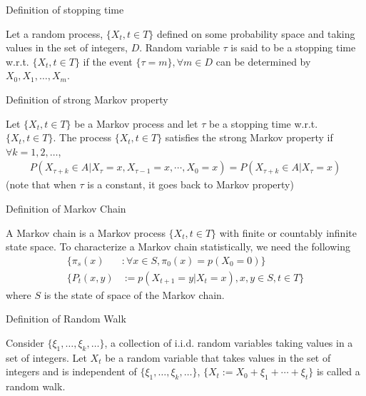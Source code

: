 \documentclass[11pt]{article}
\newcommand*{\xfield}[1]{\begin{mdframed}\centering #1\end{mdframed}\bigskip}
\newenvironment{field}{}{}
\newenvironment{note}{}{}
\begin{document}
%
\begin{note}
  \xfield{Definition of stopping time}
  \begin{field}
    Let a random process, \(\{X_t, t \in T\}\) defined on
    some probability space and taking values in the set of
    integers, \(D\). Random variable \(\tau\) is said to be a stopping time
    w.r.t. \(\{X_t, t \in T\}\) if the event \(\{\tau = m\}, \forall m
    \in D\) can be determined by \(X_0, X_1, \ldots, X_m\).
  \end{field}
\end{note}
%
\begin{note}
  \xfield{Definition of strong Markov property}
  \begin{field}
    Let \(\{X_t, t \in T\}\) be a Markov process and let \(\tau\) be a
    stopping time w.r.t. \(\{X_t, t \in T\}\). The process \(\{X_t, t
    \in T\}\) satisfies the strong Markov property if \(\forall k =
    1,2,\ldots\),
    \begin{align*}
      P(X_{\tau+k} \in A | X_\tau = x, X_{\tau - 1} = x, \cdots, X_0 =
      x) = P(X_{\tau + k} \in A | X_\tau = x)
    \end{align*}
    (note that when \(\tau\) is a constant, it goes back to Markov property)
  \end{field}
\end{note}
%
\begin{note}
  \xfield{Definition of Markov Chain}
  \begin{field}
    A Markov chain is a Markov process \(\{X_t, t \in T\}\) with
    finite or countably infinite state space. To characterize a Markov
    chain statistically, we need the following
    \begin{align*}
      \{\pi_s(x) & : \forall x \in S, \pi_0(x) = p(X_0 = 0)\} \\
      \{P_t(x, y) & := p(X_{t+1} = y | X_t = x), x, y \in S, t \in T\}
    \end{align*}
    where \(S\) is the state of space of the Markov chain.
  \end{field}
\end{note}
%
\begin{note}
  \xfield{Definition of Random Walk}
  \begin{field}
    Consider \(\{\xi_1, \ldots, \xi_k, \ldots\}\), a collection of
    i.i.d. random variables taking values in a set of integers. Let
    \(X_t\) be a random variable that takes values in the set of
    integers and is independent of \(\{\xi_1, \ldots, \xi_k,
    \ldots\}\), \(\{X_t := X_0 + \xi_1 + \cdots + \xi_t\}\) is called
    a random walk.
  \end{field}
\end{note}
\end{document}
